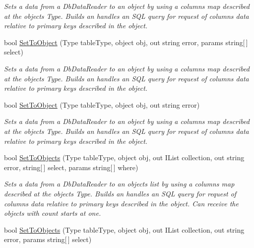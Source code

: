 \begin{DoxyCompactItemize}
\begin{DoxyCompactList}\small\item\em Sets a data from a Db\+Data\+Reader to an object by using a columns map described at the object\textquotesingle{}s Type. Builds an handles an S\+QL query for request of columns data relative to primary keys described in the object. \end{DoxyCompactList}\item 
bool \mbox{\hyperlink{interface_uniform_data_operator_1_1_sql_1_1_i_sql_operator_a5d151cd156c1ced0e9fe09be866adae7}{Set\+To\+Object}} (Type table\+Type, object obj, out string error, params string\mbox{[}$\,$\mbox{]} select)
\begin{DoxyCompactList}\small\item\em Sets a data from a Db\+Data\+Reader to an object by using a columns map described at the object\textquotesingle{}s Type. Builds an handles an S\+QL query for request of columns data relative to primary keys described in the object. \end{DoxyCompactList}\item 
bool \mbox{\hyperlink{interface_uniform_data_operator_1_1_sql_1_1_i_sql_operator_ac170526dd0fa31f2848ece5f5c5bb9d7}{Set\+To\+Object}} (Type table\+Type, object obj, out string error)
\begin{DoxyCompactList}\small\item\em Sets a data from a Db\+Data\+Reader to an object by using a columns map described at the object\textquotesingle{}s Type. Builds an handles an S\+QL query for request of columns data relative to primary keys described in the object. \end{DoxyCompactList}\item 
bool \mbox{\hyperlink{interface_uniform_data_operator_1_1_sql_1_1_i_sql_operator_ae5c6fb9c7448e7171414b7d20095cc08}{Set\+To\+Objects}} (Type table\+Type, object obj, out I\+List collection, out string error, string\mbox{[}$\,$\mbox{]} select, params string\mbox{[}$\,$\mbox{]} where)
\begin{DoxyCompactList}\small\item\em Sets a data from a Db\+Data\+Reader to an objects list by using a columns map described at the object\textquotesingle{}s Type. Builds an handles an S\+QL query for request of columns data relative to primary keys described in the object. Can receive the objects with count starts at one. \end{DoxyCompactList}\item 
bool \mbox{\hyperlink{interface_uniform_data_operator_1_1_sql_1_1_i_sql_operator_ac75ce5e3b29a8d2d94f96d4a9ff47820}{Set\+To\+Objects}} (Type table\+Type, object obj, out I\+List collection, out string error, params string\mbox{[}$\,$\mbox{]} select)

\end{DoxyCompactItemize}

